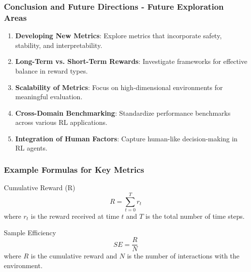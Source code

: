 \documentclass{beamer}
\begin{document}
\begin{frame}[fragile]
    \frametitle{Conclusion and Future Directions - Future Exploration Areas}
    \begin{enumerate}
        \item \textbf{Developing New Metrics}: Explore metrics that incorporate safety, stability, and interpretability.
        \item \textbf{Long-Term vs. Short-Term Rewards}: Investigate frameworks for effective balance in reward types.
        \item \textbf{Scalability of Metrics}: Focus on high-dimensional environments for meaningful evaluation.
        \item \textbf{Cross-Domain Benchmarking}: Standardize performance benchmarks across various RL applications.
        \item \textbf{Integration of Human Factors}: Capture human-like decision-making in RL agents.
    \end{enumerate}
\end{frame}

\begin{frame}[fragile]
    \frametitle{Example Formulas for Key Metrics}
    \begin{block}{Cumulative Reward (R)}
        \[
        R = \sum_{t=0}^{T} r_t
        \]
        where \( r_t \) is the reward received at time \( t \) and \( T \) is the total number of time steps.
    \end{block}
    
    \begin{block}{Sample Efficiency}
        \[
        SE = \frac{R}{N}
        \]
        where \( R \) is the cumulative reward and \( N \) is the number of interactions with the environment.
    \end{block}
\end{frame}
\end{document}
